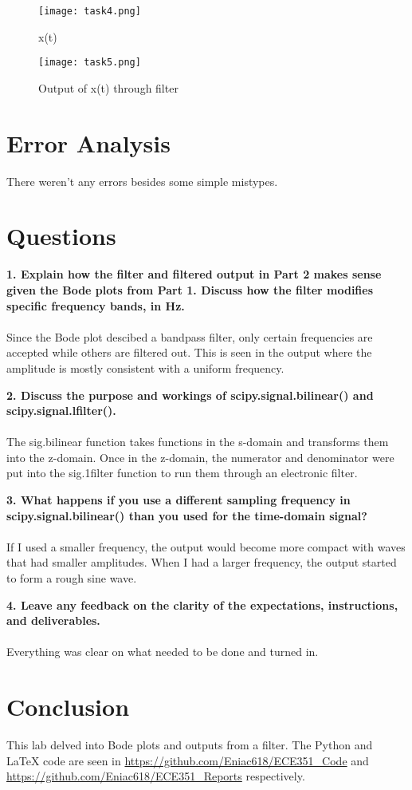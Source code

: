 \documentclass[12pt]{report}
\begin{document}
\begin{figure}[htp]
    \centering
    \texttt{[image: task4.png]}
    \caption{x(t)}
\end{figure}

\begin{figure}[htp]
    \centering
    \texttt{[image: task5.png]}
    \caption{Output of x(t) through filter}
\end{figure}

\pagebreak
\section{Error Analysis}
There weren't any errors besides some simple mistypes.
\section{Questions}
\textbf{1. Explain how the filter and filtered output in Part 2 makes sense given the Bode plots from
Part 1. Discuss how the filter modifies specific frequency bands, in Hz.} \\ \\
Since the Bode plot descibed a bandpass filter, only certain frequencies are accepted while others are filtered out. This is seen in the output where the amplitude is mostly consistent with a uniform frequency.

\textbf{2. Discuss the purpose and workings of
scipy.signal.bilinear() and scipy.signal.lfilter().} \\ \\
The sig.bilinear function takes functions in the s-domain and transforms them into the z-domain. Once in the z-domain, the numerator and denominator were put into the sig.1filter function to run them through an electronic filter.

\textbf{3. What happens if you use a different sampling frequency in scipy.signal.bilinear() than
you used for the time-domain signal?} \\ \\
If I used a smaller frequency, the output would become more compact with waves that had smaller amplitudes. When I had a larger frequency, the output started to form a rough sine wave.

\textbf{4. Leave any feedback on the clarity of the expectations, instructions, and deliverables.} \\ \\
Everything was clear on what needed to be done and turned in.

\section{Conclusion}
This lab delved into Bode plots and outputs from a filter. The Python and \LaTeX{} code are seen in \url{https://github.com/Eniac618/ECE351_Code} and \url{https://github.com/Eniac618/ECE351_Reports} respectively.
\end{document}
